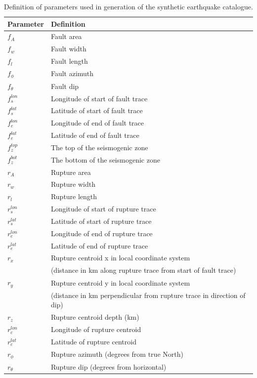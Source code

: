 \begin{table}
\caption{Definition of parameters used in generation of the synthetic earthquake catalogue.}
 \label{tab:parameters}
\begin{tabular}{l |  l}
\hline
Parameter & Definition \\
\hline \hline
$f_A$ & Fault area \\
$f_w$ & Fault width \\ 
$f_l$ & Fault length \\
$f_\phi$ & Fault azimuth \\
$f_\theta$ & Fault dip \\
$f_s^{lon}$ & Longitude of start of fault trace \\
$f_s^{lat}$ & Latitude of start of fault trace \\
$f_e^{lon}$ & Longitude of end of fault trace \\
$f_e^{lat}$ & Latitude of end of fault trace \\
$f_z^{top}$ & The top of the seismogenic zone \\
$f_z^{bot}$ & The bottom of the seismogenic zone \\ 
$r_A$ & Rupture area \\
$r_w$ & Rupture width \\
$r_l$ & Rupture length \\
$r_s^{lon}$ & Longitude of start of rupture trace \\
$r_s^{lat}$ & Latitude of start of rupture trace \\
$r_e^{lon}$ & Longitude of end of rupture trace \\
$r_e^{lat}$ & Latitude of end of rupture trace \\
$r_x$ & Rupture centroid x in local coordinate system \\ 
& (distance in km along rupture trace from start of fault trace) \\
$r_y$ & Rupture centroid y in local coordinate system \\ 
& (distance in km perpendicular from rupture trace in direction of dip) \\
$r_z$ & Rupture centroid depth (km) \\
$r_c^{lon}$ & Longitude of rupture centroid \\
$r_c^{lat}$ & Latitude of rupture centroid \\
$r_\phi$ & Rupture azimuth (degrees from true North) \\
$r_\theta$ & Rupture dip (degrees from horizontal) \\

\end{tabular}
\end{table}
